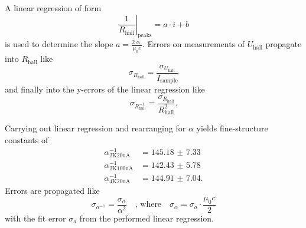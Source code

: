 A linear regression of form
\begin{equation*}
	\left. \frac{1}{R_\text{hall}}\right\rvert_\text{peaks} = a\cdot i + b
\end{equation*}
is used to determine the slope $a=\frac{2\upalpha}{\mu_0 c}$.
Errors on measurements of $U_\text{hall}$ propagate into $R_\text{hall}$ like
\begin{equation*}
	\sigma_{R_\text{hall}} = \frac{\sigma_{U_\text{hall}}}{I_\text{sample}}
\end{equation*}
and finally into the y-errors of the linear regression like
\begin{equation*}
	\sigma_{R^{-1}_\text{hall}} = \frac{\sigma_{R_\text{hall}}}{R_\text{hall}^2}.
\end{equation*}

Carrying out linear regression and rearranging for $\alpha$ yields fine-structure constants of
\begin{align*}
	\alpha^{-1}_\text{2K20uA} &= \num{145.18(733)} \\
	\alpha^{-1}_\text{2K100uA} &= \num{142.43(578)} \\
	\alpha^{-1}_\text{4K20uA} &= \num{144.91(704)}.
\end{align*}
Errors are propagated like
\begin{equation*}
	\sigma_{\alpha^{-1}} = \frac{\sigma_\alpha}{\alpha^2}\quad\text{, where}\quad\sigma_\alpha = \sigma_a\cdot\frac{\mu_0c}{2}
\end{equation*}
with the fit error $\sigma_a$ from the performed linear regression.
